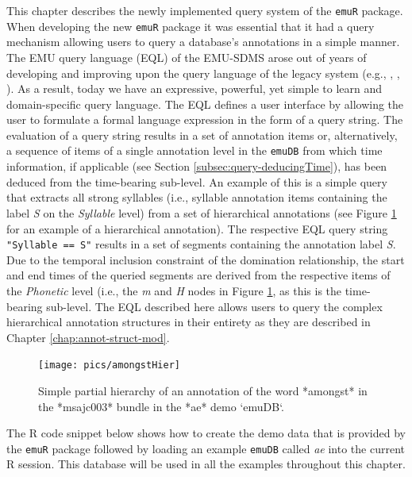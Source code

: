 \documentclass[]{book}
\begin{document}
This chapter describes the newly implemented query system of the \texttt{emuR} package. When developing the new \texttt{emuR} package it was essential that it had a query mechanism allowing users to query a database's annotations in a simple manner. The EMU query language (EQL) of the EMU-SDMS arose out of years of developing and improving upon the query language of the legacy system (e.g., \citet{cassidy:sc2001a}, \citet{harrington:2010a}, \citet{john:2012a}). As a result, today we have an expressive, powerful, yet simple to learn and domain-specific query language. The EQL defines a user interface by allowing the user to formulate a formal language expression in the form of a query string. The evaluation of a query string results in a set of annotation items or, alternatively, a sequence of items of a single annotation level in the \texttt{emuDB} from which time information, if applicable (see Section \ref{subsec:query-deducingTime}), has been deduced from the time-bearing sub-level. An example of this is a simple query that extracts all strong syllables (i.e., syllable annotation items containing the label \emph{S} on the \emph{Syllable} level) from a set of hierarchical annotations (see Figure \ref{fig:amongstHier} for an example of a hierarchical annotation). The respective EQL query string \texttt{"Syllable\ ==\ S"} results in a set of segments containing the annotation label \emph{S}. Due to the temporal inclusion constraint of the domination relationship, the start and end times of the queried segments are derived from the respective items of the \emph{Phonetic} level (i.e., the \emph{m} and \emph{H} nodes in Figure \ref{fig:amongstHier}, as this is the time-bearing sub-level. The EQL described here allows users to query the complex hierarchical annotation structures in their entirety as they are described in Chapter \ref{chap:annot-struct-mod}.

\begin{figure}

{\centering \texttt{[image: pics/amongstHier]} 

}

\caption{Simple partial hierarchy of an annotation of the word *amongst* in the *msajc003* bundle in the *ae* demo `emuDB`.}\label{fig:amongstHier}
\end{figure}

The R code snippet below shows how to create the demo data that is provided by the \texttt{emuR} package followed by loading an example \texttt{emuDB} called \emph{ae} into the current R session. This database will be used in all the examples throughout this chapter.
\end{document}
